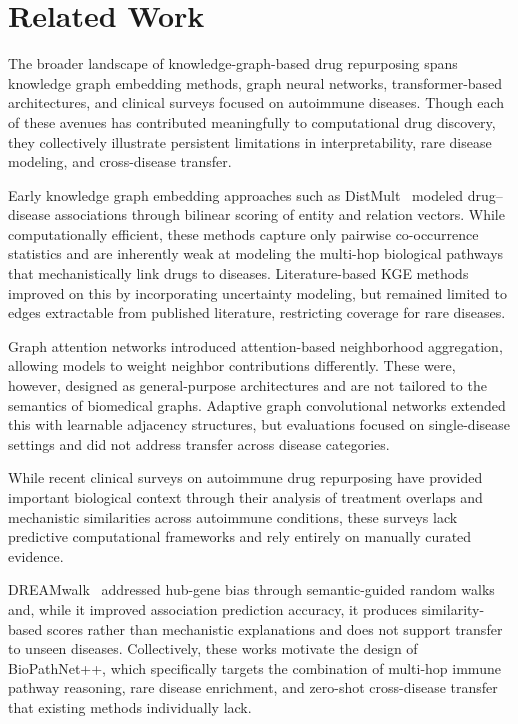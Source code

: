 \documentclass[conference]{IEEEtran}
\begin{document}
\section{Related Work}

The broader landscape of knowledge-graph-based drug repurposing spans knowledge graph embedding methods, graph neural networks, transformer-based architectures, and clinical surveys focused on autoimmune diseases. Though each of these avenues has contributed meaningfully to computational drug discovery, they collectively illustrate persistent limitations in interpretability, rare disease modeling, and cross-disease transfer.

Early knowledge graph embedding approaches such as DistMult~\cite{distmult} modeled drug--disease associations through bilinear scoring of entity and relation vectors. While computationally efficient, these methods capture only pairwise co-occurrence statistics and are inherently weak at modeling the multi-hop biological pathways that mechanistically link drugs to diseases. Literature-based KGE methods improved on this by incorporating uncertainty modeling, but remained limited to edges extractable from published literature, restricting coverage for rare diseases.

Graph attention networks introduced attention-based neighborhood aggregation, allowing models to weight neighbor contributions differently. These were, however, designed as general-purpose architectures and are not tailored to the semantics of biomedical graphs. Adaptive graph convolutional networks extended this with learnable adjacency structures, but evaluations focused on single-disease settings and did not address transfer across disease categories.

While recent clinical surveys on autoimmune drug repurposing have provided important biological context through their analysis of treatment overlaps and mechanistic similarities across autoimmune conditions, these surveys lack predictive computational frameworks and rely entirely on manually curated evidence.

DREAMwalk~\cite{dreamwalk} addressed hub-gene bias through semantic-guided random walks and, while it improved association prediction accuracy, it produces similarity-based scores rather than mechanistic explanations and does not support transfer to unseen diseases. Collectively, these works motivate the design of BioPathNet++, which specifically targets the combination of multi-hop immune pathway reasoning, rare disease enrichment, and zero-shot cross-disease transfer that existing methods individually lack.
\end{document}
